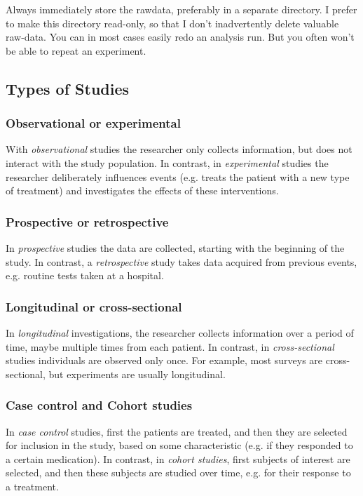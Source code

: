 Always immediately store the rawdata, preferably in a separate directory. I prefer to make this directory read-only, so that I don't inadvertently delete valuable raw-data. You can in most cases easily redo an analysis run. But you often won't be able to repeat an experiment.

\subsection{Types of Studies}

\subsubsection{Observational or experimental}
With \emph{observational} studies the researcher only collects information, but does not interact with the study population. In contrast, in \emph{experimental} studies the researcher deliberately influences events (e.g. treats the patient with a new type of treatment) and investigates the effects of these interventions.

\subsubsection{Prospective or retrospective}
In \emph{prospective} studies the data are collected, starting with the beginning of the study. In contrast, a \emph{retrospective} study takes data acquired from previous events, e.g. routine tests taken at a hospital.

\subsubsection{Longitudinal or cross-sectional}
In \emph{longitudinal} investigations, the researcher collects information over a period of time, maybe multiple times from each patient. In contrast, in \emph{cross-sectional} studies individuals are observed only once. For example, most surveys are cross-sectional, but experiments are usually longitudinal.

\subsubsection{Case control and Cohort studies}
In \emph{case control} studies, first the patients are treated, and then they are selected for inclusion in the study, based on some characteristic (e.g. if they responded to a certain medication). In contrast, in \emph{cohort studies}, first subjects of interest are selected, and then these subjects are studied over time, e.g. for their response to a treatment.

